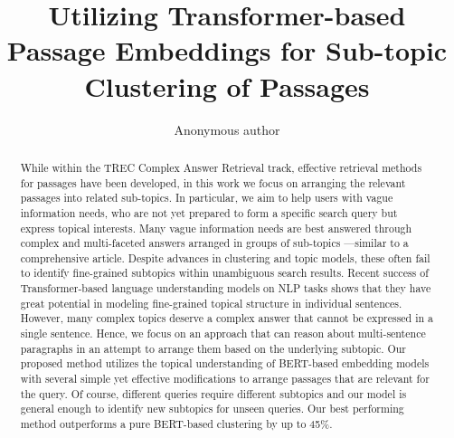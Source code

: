 \documentclass[sigconf,authordraft]{acmart}
\begin{document}
\title{Utilizing Transformer-based Passage Embeddings for Sub-topic Clustering of Passages}


\author{Anonymous author}

\renewcommand{\shortauthors}{}

\begin{abstract}
While within the TREC Complex Answer Retrieval track, effective retrieval methods for passages have been developed, in this work we focus on arranging the relevant passages into related sub-topics. In particular, we aim to help users with vague information needs, who are not yet prepared to form a specific search query but express topical interests. Many vague information needs are best answered through complex and multi-faceted answers arranged in groups of sub-topics ---similar to a comprehensive article. Despite advances in clustering and topic models, these often fail to identify fine-grained subtopics within unambiguous search results. Recent success of Transformer-based language understanding models on NLP tasks shows that they have great potential in modeling fine-grained topical structure in individual sentences. However, many complex topics deserve a complex answer that cannot be expressed in a single sentence. Hence, we focus on an approach that can reason about multi-sentence paragraphs in an attempt to arrange them based on the underlying subtopic. Our proposed method utilizes the topical understanding of BERT-based embedding models with several simple yet effective modifications to arrange passages that are relevant for the query. Of course, different queries require different subtopics and our model is general enough to identify new subtopics for unseen queries. Our best performing method outperforms a pure BERT-based clustering by up to 45\%.
\end{abstract}
\end{document}
